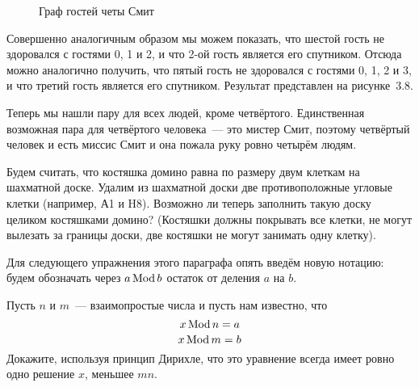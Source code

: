 \begin{example}
\begin{figure}[h]
\caption{Граф гостей четы Смит}
\end{figure}

Совершенно аналогичным образом мы можем показать, что шестой гость не здоровался с гостями 0, 1 и 2, и что 2-ой гость является его спутником. Отсюда можно аналогично получить, что пятый гость не здоровался с гостями 0, 1, 2 и 3, и что третий гость является его спутником. Результат представлен на рисунке~3.8.

Теперь мы нашли пару для всех людей, кроме четвёртого. Единственная возможная пара для четвёртого человека~--- это мистер Смит, поэтому четвёртый человек и есть миссис Смит и она пожала руку ровно четырём людям.
\end{example}

\begin{exercise}
Будем считать, что костяшка домино равна по размеру двум клеткам на шахматной доске. Удалим из шахматной доски две противоположные угловые клетки (например, А1 и H8). Возможно ли теперь заполнить такую доску целиком костяшками домино? (Костяшки должны покрывать все клетки, не могут вылезать за границы доски, две костяшки не могут занимать одну клетку).
\end{exercise}

Для следующего упражнения этого параграфа опять введём новую нотацию: будем обозначать через $a\operatorname{Mod} b$ остаток от деления $a$ на $b$.

\begin{exercise}
Пусть $n$ и $m$~--- взаимопростые числа и пусть нам известно, что
$$x\operatorname{Mod} n = a$$
$$x\operatorname{Mod} m = b$$
Докажите, используя принцип Дирихле, что это уравнение всегда имеет ровно одно решение $x$, меньшее $mn$.
\end{exercise}

